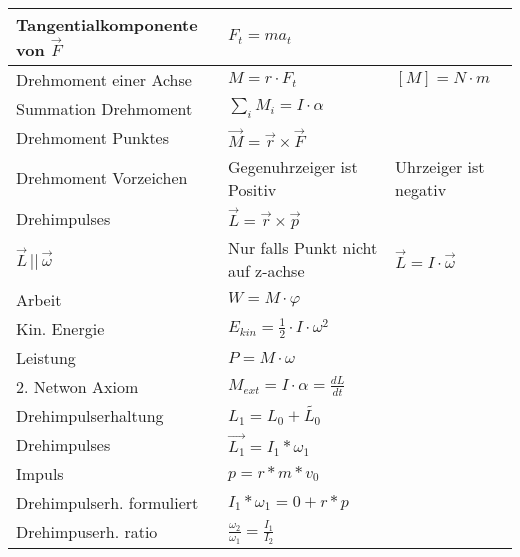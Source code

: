 \begin{tabularx}{\columnwidth}{@{}XXX@{}}
	Tangentialkomponente von $\vec{F}$ & $F_t = ma_t$                                                                     \\ \hline
	Drehmoment einer Achse             & $M = r\cdot F_t$                              & $[M] = N\cdot m$                 \\ \hline
	Summation Drehmoment               & $\sum_{i} M_i = I\cdot\alpha$                                                    \\ \hline
	Drehmoment Punktes                 & $\vec{M} = \vec{r} \times \vec{F}$                                               \\ \hline
	Drehmoment Vorzeichen              & Gegenuhrzeiger ist Positiv                    & Uhrzeiger ist negativ            \\ \hline
	Drehimpulses                       & $\vec{L} = \vec{r} \times \vec{p}$                                               \\ \hline
	$\vec{L}\,||\,\vec{\omega}$        & Nur falls Punkt nicht auf z-achse             & $\vec{L} = I \cdot \vec{\omega}$ \\ \hline
	Arbeit                             & $W = M \cdot \varphi$                                                            \\ \hline
	Kin. Energie                       & $E_{kin} = \frac{1}{2}\cdot I \cdot \omega^2$                                    \\ \hline
	Leistung                           & $P = M \cdot \omega$                                                             \\ \hline
	2. Netwon Axiom                    & $M_{ext} = I \cdot \alpha = \frac{dL}{dt}$                                      \\ \hline
	Drehimpulserhaltung				   & $L_1 = L_0 + \tilde{L_0}$ \\ \hline
	Drehimpulses                       & $\vec{L_1} = I_1*\omega_1$                                               \\ \hline
	Impuls							   & $p = r*m*v_0$ \\ \hline
	Drehimpulserh. formuliert		   & $I_1*\omega_1 = 0 + r*p$ \\ \hline
	Drehimpuserh. ratio 			   & $\frac{\omega_2}{\omega_1} = \frac{I_1}{I_2}$ \\ \hline

\end{tabularx}